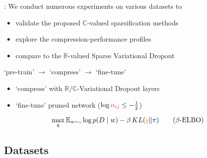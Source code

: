 \documentclass[handout]{beamer}
\newcommand{\real}{\mathbb{R}}
\newcommand{\cplx}{\mathbb{C}}
\begin{document}
\begin{frame}[c]{\insertsection: \insertsubsection}
  We conduct numerous experiments on various datasets to
  \begin{itemize}
    \item validate the proposed $\cplx$-valued sparsification methods
    \item explore the compression-performance profiles
    \item compare to the $\real$-valued Sparse Variational Dropout
  \end{itemize}

  \pause
  \bigskip
  `pre-train' $\to$ `compress' $\to$ `fine-tune'
  \begin{itemize}
    \item `compress' with $\real$/$\cplx$-Variational Dropout layers
    \item `fine-tune' pruned network ($
      \log{{\color{red} \alpha_{ij}}} \leq -\tfrac12
    $)
  \end{itemize}

  \pause
  \bigskip
  \begin{equation}  \label{eq:beta_elbo}
    \max_q
    \mathbb{E}_{w \sim {\color{orange} q}}
      \log p(D \mid w)  %
      - \beta \mathop{KL}({\color{orange} q}\|{\color{blue} \pi})
    \tag{$\beta$-ELBO}
  \end{equation}

\end{frame}


\subsection{Datasets} %
\label{sub:datasets}
\end{document}
